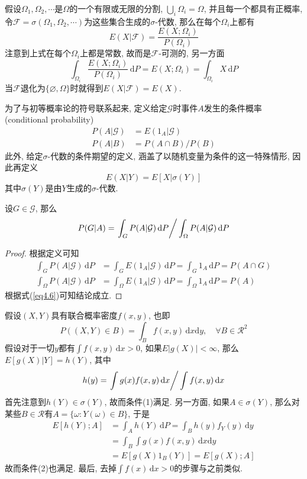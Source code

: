 \documentclass[cn, 12pt, math=mtpro2, bibstyle=apa, blue, twocol]{elegantbook}
\newcommand{\F}{\mathcal{F}}
\newcommand{\G}{\mathcal{G}}
\let\emptyset\varnothing
\begin{document}
\begin{example}
假设$\Omega_1,\Omega_2,\cdots$是$\Omega$的一个有限或无限的分割, $\bigcup_i\Omega_i=\Omega$, 并且每一个都具有正概率, 令$\F=\sigma(\Omega_1,\Omega_2,\cdots)$为这些集合生成的$\sigma$-代数, 那么在每个$\Omega_i$上都有
$$E(X|\F)=\frac{E(X;\Omega_i)}{P(\Omega_i)}$$
注意到上式在每个$\Omega_i$上都是常数, 故而是$\F$-可测的, 另一方面
$$\int_{\Omega_i}\frac{E(X;\Omega_i)}{P(\Omega_i)}\,\text{d}P=E(X;\Omega_i)=\int_{\Omega_i}X\,\text{d}P$$
当$\F$退化为$\{\emptyset,\Omega\}$时就得到$E(X|\F)=E(X)$.
\end{example}

为了与初等概率论的符号联系起来, 定义给定$\G$时事件$A$发生的条件概率 (conditional probability)
\begin{align}
P(A|\mathcal{G})&=E(1_A|\mathcal{G}) \nonumber \\
P(A|B)&=P(A\cap B)/P(B) \label{eq4.6}
\end{align}
此外, 给定$\sigma$-代数的条件期望的定义, 涵盖了以随机变量为条件的这一特殊情形, 因此再定义
$$E(X|Y)=E[X|\sigma(Y)]$$
其中$\sigma(Y)$是由$Y$生成的$\sigma$-代数.

\begin{example}[$\,$Bayes公式]
设$G\in\G$, 那么
$$P(G|A)=\left.\int_GP(A|\G)\,\text{d}P\right/\int_\Omega P(A|\G)\,\text{d}P$$
\end{example}
\begin{proof}
  根据定义可知
  \begin{align*}
  \int_GP(A|\G)\,\text{d}P&=\int_GE(1_A|\G)\,\text{d}P=\int_G1_A\,\text{d}P=P(A\cap G) \\
  \int_\Omega P(A|\G)\,\text{d}P&=\int_\Omega E(1_A|\G)\,\text{d}P=\int_\Omega1_A\,\text{d}P=P(A)
  \end{align*}
  根据式(\ref{eq4.6})可知结论成立.
\end{proof}

\begin{example}
假设$(X,Y)$具有联合概率密度$f(x,y)$, 也即
$$P((X,Y)\in B)=\int_B f(x,y)\,\text{d}x\text{d}y,\quad \forall B\in\mathcal{R}^2$$
假设对于一切$y$都有$\int f(x,y)\,\text{d}x>0$, 如果$E|g(X)|<\infty$, 那么$E[g(X)|Y]=h(Y)$, 其中
$$h(y)=\left.\int g(x)f(x,y)\,\text{d}x\right/\int f(x,y)\,\text{d}x$$
首先注意到$h(Y)\in\sigma(Y)$, 故而条件(1)满足. 另一方面, 如果$A\in\sigma(Y)$, 那么对某些$B\in\mathcal{R}$有$A=\{\omega: Y(\omega)\in B\}$, 于是
\begin{align*}
E[h(Y);A]&=\int_Ah(Y)\,\text{d}P=\int_Bh(y)f_Y(y)\,\text{d}y \\
&=\int_B\int g(x)f(x,y)\,\text{d}x\text{d}y \\
&=E[g(X)1_B(Y)]=E[g(X);A]
\end{align*}
故而条件(2)也满足. 最后, 去掉$\int f(x)\,\text{d}x>0$的步骤与之前类似.
\end{example}
\end{document}
